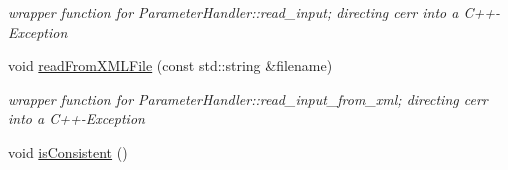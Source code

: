 \begin{DoxyCompactItemize}
\begin{DoxyCompactList}\small\item\em wrapper function for ParameterHandler::read\_\-input; directing cerr into a C++-\/Exception \item\end{DoxyCompactList}\item 
\hypertarget{classnatrium_1_1SolverConfiguration_a18c63509007270fa96212fef36a2c172}{
void \hyperlink{classnatrium_1_1SolverConfiguration_a18c63509007270fa96212fef36a2c172}{readFromXMLFile} (const std::string \&filename)}
\label{classnatrium_1_1SolverConfiguration_a18c63509007270fa96212fef36a2c172}

\begin{DoxyCompactList}\small\item\em wrapper function for ParameterHandler::read\_\-input\_\-from\_\-xml; directing cerr into a C++-\/Exception \item\end{DoxyCompactList}\item 
\hypertarget{classnatrium_1_1SolverConfiguration_a90f8fb87f504897d3bbbc746749d2967}{
void \hyperlink{classnatrium_1_1SolverConfiguration_a90f8fb87f504897d3bbbc746749d2967}{isConsistent} ()}
\label{classnatrium_1_1SolverConfiguration_a90f8fb87f504897d3bbbc746749d2967}


\end{DoxyCompactItemize}
